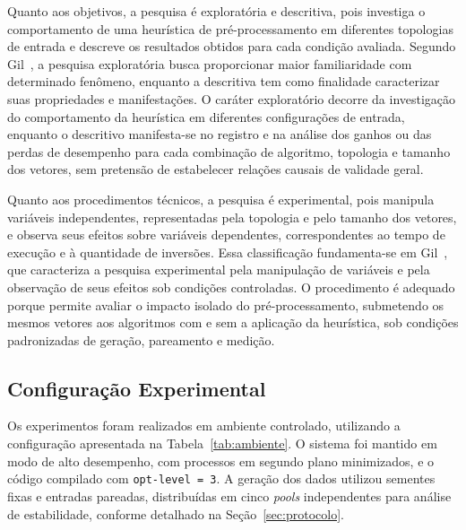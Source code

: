 \documentclass[12pt]{article}
\begin{document}
Quanto aos objetivos, a pesquisa é exploratória e descritiva, pois investiga o comportamento de uma heurística de pré-processamento em diferentes topologias de entrada e descreve os resultados obtidos para cada condição avaliada. Segundo Gil~\cite{gil_metodos_2019}, a pesquisa exploratória busca proporcionar maior familiaridade com determinado fenômeno, enquanto a descritiva tem como finalidade caracterizar suas propriedades e manifestações. O caráter exploratório decorre da investigação do comportamento da heurística em diferentes configurações de entrada, enquanto o descritivo manifesta-se no registro e na análise dos ganhos ou das perdas de desempenho para cada combinação de algoritmo, topologia e tamanho dos vetores, sem pretensão de estabelecer relações causais de validade geral.

Quanto aos procedimentos técnicos, a pesquisa é experimental, pois manipula variáveis independentes, representadas pela topologia e pelo tamanho dos vetores, e observa seus efeitos sobre variáveis dependentes, correspondentes ao tempo de execução e à quantidade de inversões. Essa classificação fundamenta-se em Gil~\cite{gil_metodos_2019}, que caracteriza a pesquisa experimental pela manipulação de variáveis e pela observação de seus efeitos sob condições controladas. O procedimento é adequado porque permite avaliar o impacto isolado do pré-processamento, submetendo os mesmos vetores aos algoritmos com e sem a aplicação da heurística, sob condições padronizadas de geração, pareamento e medição.

\subsection{Configuração Experimental}\label{sec:config}

Os experimentos foram realizados em ambiente controlado, utilizando a configuração apresentada na Tabela~\ref{tab:ambiente}. O sistema foi mantido em modo de alto desempenho, com processos em segundo plano minimizados, e o código compilado com \texttt{opt-level = 3}. A geração dos dados utilizou sementes fixas e entradas pareadas, distribuídas em cinco \emph{pools} independentes para análise de estabilidade, conforme detalhado na Seção~\ref{sec:protocolo}.
\end{document}
